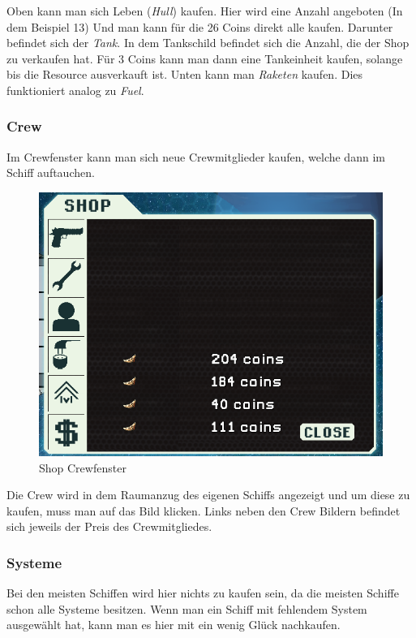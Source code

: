 \documentclass[fontsize=12pt,paper=a4,twoside]{scrartcl}
\begin{document}
Oben kann man sich Leben (\textit{Hull}) kaufen. Hier wird eine Anzahl angeboten (In dem Beispiel 13) Und man kann für die 26 Coins direkt alle kaufen. Darunter befindet sich der \textit{Tank}. In dem Tankschild befindet sich die Anzahl, die der Shop zu verkaufen hat. Für 3 Coins kann man dann eine Tankeinheit kaufen, solange bis die Resource ausverkauft ist. Unten kann man \textit{Raketen} kaufen. Dies funktioniert analog zu \textit{Fuel}. 

\subsubsection{Crew}

Im Crewfenster kann man sich neue Crewmitglieder kaufen, welche dann im Schiff auftauchen. 

\begin{figure}[H]
\centering
\includegraphics[width=1\linewidth]{DasSpiel/Shop/crew.png}
\caption{Shop Crewfenster}
\end{figure}

Die Crew wird in dem Raumanzug des eigenen Schiffs angezeigt und um diese zu kaufen, muss man auf das Bild klicken. Links neben den Crew Bildern befindet sich jeweils der Preis des Crewmitgliedes. 

\subsubsection{Systeme}

Bei den meisten Schiffen wird hier nichts zu kaufen sein, da die meisten Schiffe schon alle Systeme besitzen. Wenn man ein Schiff mit fehlendem System ausgewählt hat, kann man es hier mit ein wenig Glück nachkaufen. 
\end{document}
